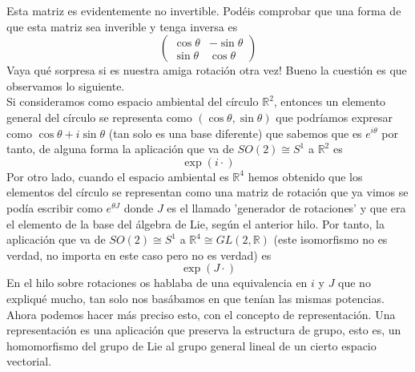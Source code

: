 \documentclass[12pt]{article}
\begin{document}
Esta matriz es evidentemente no invertible. Podéis comprobar que una forma de que esta matriz sea inverible y tenga inversa es
\begin{equation*}
    \begin{pmatrix}
        \cos\theta & -\sin\theta \\ \sin\theta & \cos\theta
    \end{pmatrix}
\end{equation*}
Vaya qué sorpresa si es nuestra amiga rotación otra vez! Bueno la cuestión es que observamos lo siguiente.\\
Si consideramos como espacio ambiental del círculo $\mathbb{R}^2$, entonces un elemento general del círculo se representa como $(\cos\theta,\sin\theta)$ que podríamos expresar como $\cos\theta+i\sin\theta$ (tan solo es una base diferente) que sabemos que es $e^{i\theta}$ por tanto, de alguna forma la aplicación que va de $SO(2)\cong S^1$ a $\mathbb{R}^2$ es
\begin{equation*}
    \exp(i \cdot) 
\end{equation*}
Por otro lado, cuando el espacio ambiental es $\mathbb{R}^4$ hemos obtenido que los elementos del círculo se representan como una matriz de rotación que ya vimos se podía escribir como $e^{\theta J}$ donde $J$ es el llamado 'generador de rotaciones' y que era el elemento de la base del álgebra de Lie, según el anterior hilo. Por tanto, la aplicación que va de $SO(2)\cong S^1$ a $\mathbb{R}^4\cong GL(2,\mathbb{R})$ (este isomorfismo no es verdad, no importa en este caso pero no es verdad) es 
\begin{equation*}
    \exp(J \cdot) 
\end{equation*}
En el hilo sobre rotaciones os hablaba de una equivalencia en $i$ y $J$ que no expliqué mucho, tan solo nos basábamos en que tenían las mismas potencias. Ahora podemos hacer más preciso esto, con el concepto de representación. Una representación es una aplicación que preserva la estructura de grupo, esto es, un homomorfismo del grupo de Lie al grupo general lineal de un cierto espacio vectorial.
\end{document}
